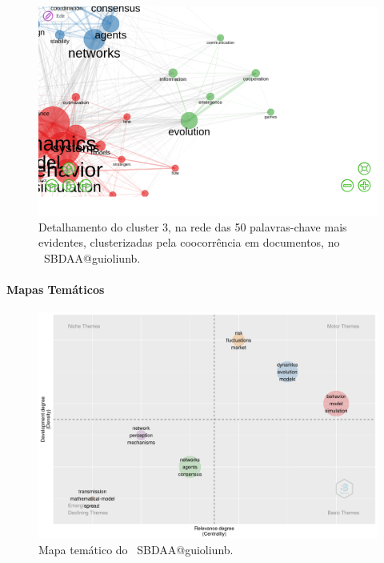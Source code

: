 \begin{figure}
    \centering
    \includegraphics[width=1\textwidth]{experiments/jhcf/PesqBibliogr/SimulacaoMultiagente/WoS-20220203/Estrutura/Conceitual/MASSA2-Cluster3-Co-occurrence-Network-50nodes-louvainclustering.png.png.png}
    \caption{Detalhamento do cluster 3, na rede das 50 palavras-chave mais evidentes, clusterizadas pela coocorrência em documentos, no  \dataset\ SBDAA@guioliunb.}
    \label{fig:MASSA2-Cluster3-Co-occurrence-Network-50nodes-louvainclustering.png.png}
\end{figure}

\paragraph{Mapas Temáticos}

\begin{figure}
    \centering
    \includegraphics[width=1\textwidth]{experiments/jhcf/PesqBibliogr/SimulacaoMultiagente/WoS-20220203/Estrutura/Conceitual/MASSA2-ThematicMap.png}
    \caption{Mapa temático do  \dataset\ SBDAA@guioliunb.}
    \label{fig:MASSA2-ThematicMap}
\end{figure}

